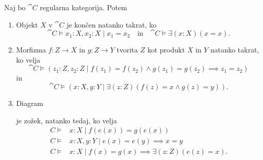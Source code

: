 \documentclass[../kategoricna_logika.tex]{subfiles}
\begin{document}
  \begin{lema}\label{lema:limite-v-interni-logiki}
    Naj bo $\cat{C}$ regularna kategorija. Potem
    \begin{enumerate}[label=(\roman*)]
    \item Objekt $X$ v $\cat{C}$ je končen natanko takrat, ko
      $$\cat{C} \models x_1:X,x_2:X \mid x_1 = x_2 \quad \text{in} \quad
      {\cat{C} \models \exists (x:X) (x=x)}.$$

    \item Morfizma $f : Z \to X$ in $g : Z \to Y$ tvorita $Z$ kot
      produkt $X$ in $Y$ natanko takrat, ko velja
      \[\cat{C} \models (z_1:Z,z_2:Z \mid f(z_1) = f(z_2) \wedge
        g(z_1) = g(z_2) \implies z_1 = z_2)\] in
      \[\cat{C} \models (x:X,y:Y \mid \exists (z:Z)(f(z) = x \wedge
        g(z) = y)).\]

    \item Diagram  je zožek, natanko tedaj, ko velja
      \begin{align*}
        C \models& x:X \mid f(e(x)) = g(e(x)) \\
        C \models& x:X, y:Y \mid e(x) = e(y) \implies x = y \\
        C \models& x:X \mid f(x) = g(x) \implies \exists (z:Z)(e(z) = x).
      \end{align*}
    \end{enumerate}
  \end{lema}
\end{document}
